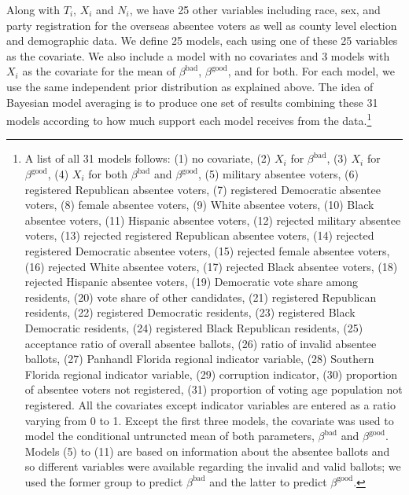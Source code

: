 \documentclass[11pt,titlepage]{article}
\newcommand{\bb}{\beta^{\text{bad}}}
\newcommand{\bg}{\beta^{\text{good}}}
\begin{document}
Along with $T_i$, $X_i$ and $N_i$, we have 25 other variables
including race, sex, and party registration for the overseas absentee
voters as well as county level election and demographic data.  We
define 25 models, each using one of these 25 variables as the
covariate.  We also include a model with no covariates and 3 models
with $X_i$ as the covariate for the mean of $\bb$, $\bg$, and for
both.  For each model, we use the same independent prior distribution
as explained above. The idea of Bayesian model averaging is to produce
one set of results combining these 31 models according to how much
support each model receives from the data.\footnote{A list of all 31
  models follows: (1) no covariate, (2) $X_i$ for $\bb$, (3) $X_i$ for
  $\bg$, (4) $X_i$ for both $\bb$ and $\bg$, (5) military absentee
  voters, (6) registered Republican absentee voters, (7) registered
  Democratic absentee voters, (8) female absentee voters, (9) White
  absentee voters, (10) Black absentee voters, (11) Hispanic absentee
  voters, (12) rejected military absentee voters, (13) rejected
  registered Republican absentee voters, (14) rejected registered
  Democratic absentee voters, (15) rejected female absentee voters,
  (16) rejected White absentee voters, (17) rejected Black absentee
  voters, (18) rejected Hispanic absentee voters, (19) Democratic vote
  share among residents, (20) vote share of other candidates, (21)
  registered Republican residents, (22) registered Democratic
  residents, (23) registered Black Democratic residents, (24)
  registered Black Republican residents, (25) acceptance ratio of
  overall absentee ballots, (26) ratio of invalid absentee ballots,
  (27) Panhandl Florida regional indicator variable, (28) Southern
  Florida regional indicator variable, (29) corruption indicator, (30)
  proportion of absentee voters not registered, (31) proportion of
  voting age population not registered.  All the covariates except
  indicator variables are entered as a ratio varying from 0 to 1.
  Except the first three models, the covariate was used to model the
  conditional untruncted mean of both parameters, $\bb$ and $\bg$.
  Models (5) to (11) are based on information about the absentee
  ballots and so different variables were available regarding the
  invalid and valid ballots; we used the former group to predict $\bb$
  and the latter to predict $\bg$.}
\end{document}
